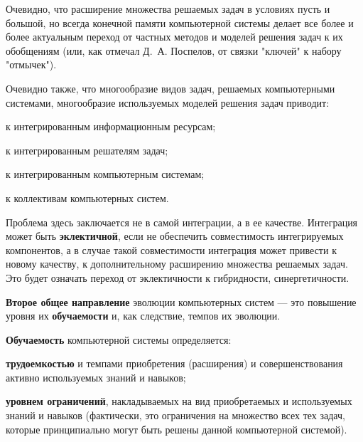 Очевидно, что расширение множества решаемых задач в условиях пусть и большой, но всегда конечной памяти компьютерной системы делает все более и более актуальным переход от частных методов и моделей решения задач к их обобщениям (или, как отмечал Д.~А. Поспелов, от связки "ключей"{} к набору "отмычек").

Очевидно также, что многообразие видов задач, решаемых компьютерными системами, многообразие используемых моделей решения задач приводит: 
\begin{textitemize}
	\item к интегрированным информационным ресурсам;
	\item к интегрированным решателям задач;
	\item к интегрированным компьютерным системам;
	\item к коллективам компьютерных систем.
\end{textitemize}

Проблема здесь заключается не в самой интеграции, а в ее качестве. Интеграция может быть \textbf{эклектичной}, если не обеспечить совместимость интегрируемых компонентов, а в случае такой совместимости интеграция может привести к новому качеству, к дополнительному расширению множества решаемых задач. Это будет означать переход от эклектичности к гибридности, синергетичности.

\textbf{Второе общее направление} эволюции компьютерных систем --- это повышение уровня их \textbf{обучаемости} и, как следствие, темпов их эволюции.

\textbf{Обучаемость} компьютерной системы определяется:
\begin{textitemize}
	\item \textbf{трудоемкостью} и темпами приобретения (расширения) и совершенствования активно используемых знаний и навыков;
	\item \textbf{уровнем ограничений}, накладываемых на вид приобретаемых и используемых знаний и навыков (фактически, это ограничения на множество всех тех задач, которые принципиально могут быть решены данной компьютерной системой).
\end{textitemize}

